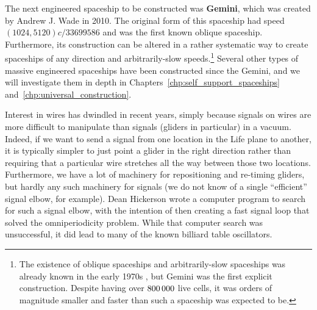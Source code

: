 The next engineered spaceship to be constructed was \textbf{Gemini}, which was created by Andrew J. Wade in 2010. The original form of this spaceship had speed $(1024,5120)c/33699586$ and was the first known oblique spaceship. Furthermore, its construction can be altered in a rather systematic way to create spaceships of any direction and arbitrarily-slow speeds.\footnote{The existence of oblique spaceships and arbitrarily-slow spaceships was already known in the early 1970s \cite{Wain74,BCG82}, but Gemini was the first explicit construction. Despite having over $800{\,}000$ live cells, it was orders of magnitude smaller and faster than such a spaceship was expected to be.} Several other types of massive engineered spaceships have been constructed since the Gemini, and we will investigate them in depth in Chapters~\ref{chp:self_support_spaceships} and~\ref{chp:universal_construction}.

Interest in wires has dwindled in recent years, simply because signals on wires are more difficult to manipulate than signals (gliders in particular) in a vacuum. Indeed, if we want to send a signal from one location in the Life plane to another, it is typically simpler to just point a glider in the right direction rather than requiring that a particular wire stretches all the way between those two locations. Furthermore, we have a lot of machinery for repositioning and re-timing gliders, but hardly any such machinery for signals (we do not know of a single ``efficient'' signal elbow, for example). Dean Hickerson wrote a computer program to search for such a signal elbow, with the intention of then creating a fast signal loop that solved the omniperiodicity problem. While that computer search was unsuccessful, it did lead to many of the known billiard table oscillators.





